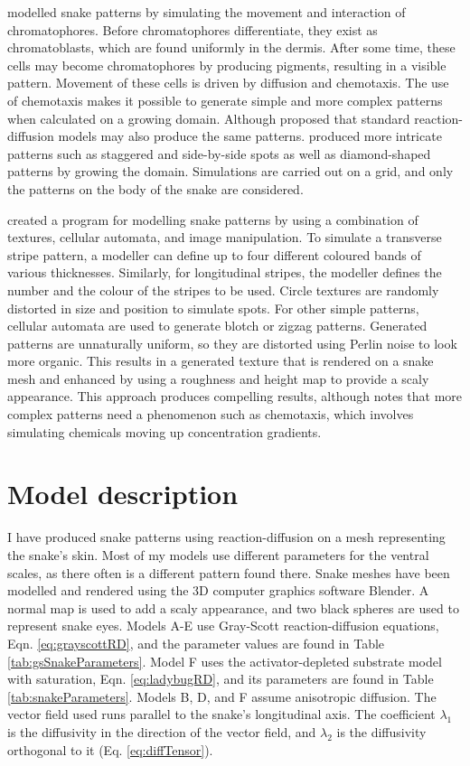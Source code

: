 \citet{murray1991} modelled snake patterns by simulating the movement and interaction of chromatophores. Before chromatophores differentiate, they exist as chromatoblasts, which are found uniformly in the dermis. After some time, these cells may become chromatophores by producing pigments, resulting in a visible pattern. Movement of these cells is driven by diffusion and chemotaxis. The use of chemotaxis makes it possible to generate simple and more complex patterns when calculated on a growing domain. Although \citet{murray1991} proposed that standard reaction-diffusion models may also produce the same patterns. \citet{murray1991} produced more intricate patterns such as staggered and side-by-side spots as well as diamond-shaped patterns by growing the domain. Simulations are carried out on a grid, and only the patterns on the body of the snake are considered.

\citet{pinheiro2017} created a program for modelling snake patterns by using a combination of textures, cellular automata, and image manipulation. To simulate a transverse stripe pattern, a modeller can define up to four different coloured bands of various thicknesses. Similarly, for longitudinal stripes, the modeller defines the number and the colour of the stripes to be used. Circle textures are randomly distorted in size and position to simulate spots. For other simple patterns, cellular automata are used to generate blotch or zigzag patterns. Generated patterns are unnaturally uniform, so they are distorted using Perlin noise to look more organic. This results in a generated texture that is rendered on a snake mesh and enhanced by using a roughness and height map to provide a scaly appearance. This approach produces compelling results, although \citet{pinheiro2017} notes that more complex patterns need a phenomenon such as chemotaxis, which involves simulating chemicals moving up concentration gradients.

\section{Model description}
I have produced snake patterns using reaction-diffusion on a mesh representing the snake's skin. Most of my models use different parameters for the ventral scales, as there often is a different pattern found there. Snake meshes have been modelled and rendered using the 3D computer graphics software Blender. A normal map is used to add a scaly appearance, and two black spheres are used to represent snake eyes. Models A-E use Gray-Scott reaction-diffusion equations, Eqn. \ref{eq:grayscottRD}, and the parameter values are found in Table \ref{tab:gsSnakeParameters}. Model F uses the activator-depleted substrate model with saturation, Eqn. \ref{eq:ladybugRD}, and its parameters are found in Table \ref{tab:snakeParameters}. Models B, D, and F assume anisotropic diffusion. The vector field used runs parallel to the snake's longitudinal axis. The coefficient $\lambda_{1}$ is the diffusivity in the direction of the vector field, and $\lambda_{2}$ is the diffusivity orthogonal to it (Eq. \ref{eq:diffTensor}). 


